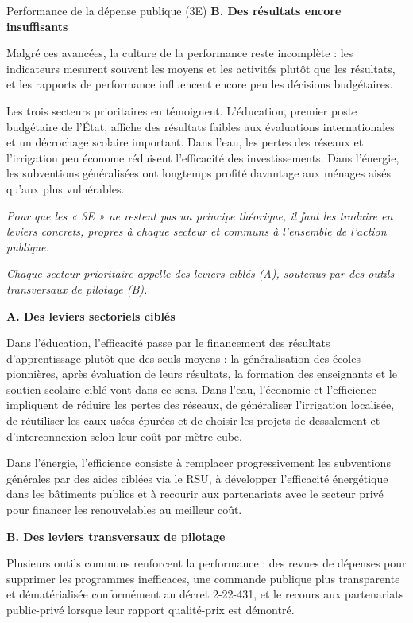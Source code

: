 \begin{copiemodele}{Performance de la dépense publique (3E)}
\textbf{B. Des résultats encore insuffisants}

Malgré ces avancées, la culture de la performance reste incomplète : les indicateurs mesurent souvent les moyens et les activités plutôt que les résultats, et les rapports de performance influencent encore peu les décisions budgétaires.

Les trois secteurs prioritaires en témoignent. L'éducation, premier poste budgétaire de l'État, affiche des résultats faibles aux évaluations internationales et un décrochage scolaire important. Dans l'eau, les pertes des réseaux et l'irrigation peu économe réduisent l'efficacité des investissements. Dans l'énergie, les subventions généralisées ont longtemps profité davantage aux ménages aisés qu'aux plus vulnérables.

\textit{Pour que les « 3E » ne restent pas un principe théorique, il faut les traduire en leviers concrets, propres à chaque secteur et communs à l'ensemble de l'action publique.}

\textit{Chaque secteur prioritaire appelle des leviers ciblés (A), soutenus par des outils transversaux de pilotage (B).}

\textbf{A. Des leviers sectoriels ciblés}

Dans l'éducation, l'efficacité passe par le financement des résultats d'apprentissage plutôt que des seuls moyens : la généralisation des écoles pionnières, après évaluation de leurs résultats, la formation des enseignants et le soutien scolaire ciblé vont dans ce sens. Dans l'eau, l'économie et l'efficience impliquent de réduire les pertes des réseaux, de généraliser l'irrigation localisée, de réutiliser les eaux usées épurées et de choisir les projets de dessalement et d'interconnexion selon leur coût par mètre cube.

Dans l'énergie, l'efficience consiste à remplacer progressivement les subventions générales par des aides ciblées via le RSU, à développer l'efficacité énergétique dans les bâtiments publics et à recourir aux partenariats avec le secteur privé pour financer les renouvelables au meilleur coût.

\textbf{B. Des leviers transversaux de pilotage}

Plusieurs outils communs renforcent la performance : des revues de dépenses pour supprimer les programmes inefficaces, une commande publique plus transparente et dématérialisée conformément au décret 2-22-431, et le recours aux partenariats public-privé lorsque leur rapport qualité-prix est démontré.


\end{copiemodele}
